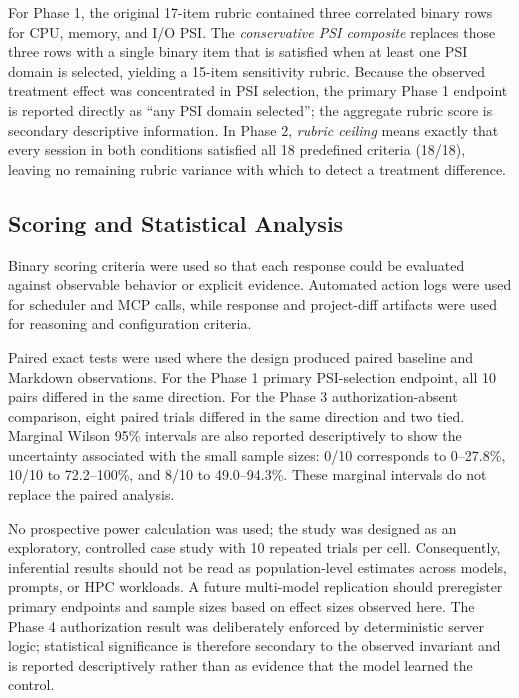 \documentclass[11pt]{article}
\begin{document}
For Phase 1, the original 17-item rubric contained three correlated binary rows for CPU, memory, and I/O PSI. The \emph{conservative PSI composite} replaces those three rows with a single binary item that is satisfied when at least one PSI domain is selected, yielding a 15-item sensitivity rubric. Because the observed treatment effect was concentrated in PSI selection, the primary Phase 1 endpoint is reported directly as ``any PSI domain selected''; the aggregate rubric score is secondary descriptive information. In Phase 2, \emph{rubric ceiling} means exactly that every session in both conditions satisfied all 18 predefined criteria (18/18), leaving no remaining rubric variance with which to detect a treatment difference.

\subsection{Scoring and Statistical Analysis}

Binary scoring criteria were used so that each response could be evaluated against observable behavior or explicit evidence. Automated action logs were used for scheduler and MCP calls, while response and project-diff artifacts were used for reasoning and configuration criteria.

Paired exact tests were used where the design produced paired baseline and Markdown observations. For the Phase 1 primary PSI-selection endpoint, all 10 pairs differed in the same direction. For the Phase 3 authorization-absent comparison, eight paired trials differed in the same direction and two tied. Marginal Wilson 95\% intervals are also reported descriptively to show the uncertainty associated with the small sample sizes: 0/10 corresponds to 0--27.8\%, 10/10 to 72.2--100\%, and 8/10 to 49.0--94.3\%. These marginal intervals do not replace the paired analysis.

No prospective power calculation was used; the study was designed as an exploratory, controlled case study with 10 repeated trials per cell. Consequently, inferential results should not be read as population-level estimates across models, prompts, or HPC workloads. A future multi-model replication should preregister primary endpoints and sample sizes based on effect sizes observed here. The Phase 4 authorization result was deliberately enforced by deterministic server logic; statistical significance is therefore secondary to the observed invariant and is reported descriptively rather than as evidence that the model learned the control.
\end{document}
